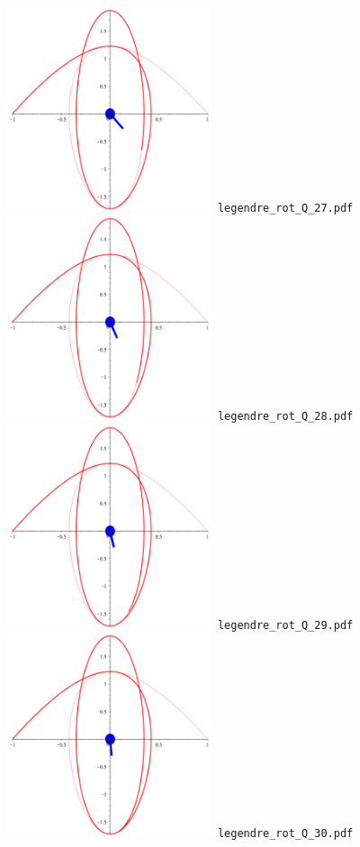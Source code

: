 \documentclass[a4paper]{amsart}
\begin{document}
\includegraphics[width=6cm]{legendre_rot_Q_27.pdf}\verb+ legendre_rot_Q_27.pdf+\\
\includegraphics[width=6cm]{legendre_rot_Q_28.pdf}\verb+ legendre_rot_Q_28.pdf+\\
\includegraphics[width=6cm]{legendre_rot_Q_29.pdf}\verb+ legendre_rot_Q_29.pdf+\\
\includegraphics[width=6cm]{legendre_rot_Q_30.pdf}\verb+ legendre_rot_Q_30.pdf+\\
\end{document}
